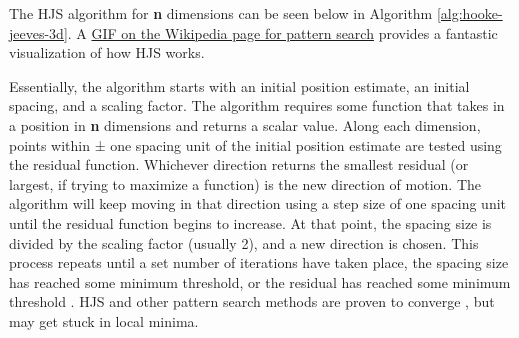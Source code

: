 \documentclass[12pt,a4paper]{report}
\begin{document}
The HJS algorithm for \textbf{n} dimensions can be seen below in Algorithm \ref{alg:hooke-jeeves-3d}. A \href{https://en.wikipedia.org/wiki/Pattern\_search\_(optimization)\#/media/File:Direct\_search\_BROYDEN.gif}{GIF on the Wikipedia page for pattern search} provides a fantastic visualization of how HJS works. 

Essentially, the algorithm starts with an initial position estimate, an initial spacing, and a scaling factor. The algorithm requires some function that takes in a position in \textbf{n} dimensions and returns a scalar value. Along each dimension, points within ± one spacing unit of the initial position estimate are tested using the residual function. Whichever direction returns the smallest residual (or largest, if trying to maximize a function) is the new direction of motion. The algorithm will keep moving in that direction using a step size of one spacing unit until the residual function begins to increase. At that point, the spacing size is divided by the scaling factor (usually 2), and a new direction is chosen. This process repeats until a set number of iterations have taken place, the spacing size has reached some minimum threshold, or the residual has reached some minimum threshold \cite{hjsstan}. HJS and other pattern search methods are proven to converge \cite{hjsconv}, but may get stuck in local minima.
\end{document}

